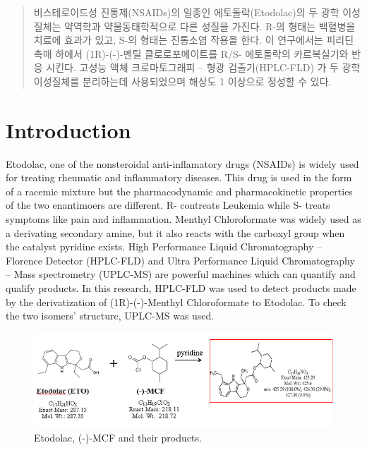 \documentclass[12pt]{article} %
\begin{document}
\renewcommand\abstractname{초\hskip6mm 록}
\begin{abstract}
  비스테로이드성 진통제(NSAIDs)의 일종인 에토돌락(Etodolac)의 두 광학 이성질체는 약역학과 약물동태학적으로 다른 성질을 가진다. R-의 형태는 백혈병을 치료에 효과가 있고, S-의 형태는 진통소염 작용을 한다. 이 연구에서는 피리딘 촉매 하에서 (1R)-(-)-멘틸 클로로포메이트를 R/S- 에토돌락의 카르복실기와 반응 시킨다. 고성능 액체 크로마토그래피 – 형광 검출기(HPLC-FLD) 가 두 광학 이성질체를 분리하는데 사용되었으며 해상도 1 이상으로 정성할 수 있다.

\end{abstract}

\newpage

\tableofcontents

\newpage

\listoffigures

\newpage

\listoftables

\newpage



\setcounter{page}{1}

\section{Introduction}

Etodolac, one of the nonsteroidal anti-inflamatory drugs (NSAIDs) is widely used for treating rheumatic and inflammatory diseases. This drug is used in the form of a racemic mixture but the pharmacodynamic and pharmacokinetic properties of the two enantimoers are different. R- contreats Leukemia\cite{cite1} while S- treats symptoms like pain and inflammation. Menthyl Chloroformate was widely used as a derivating secondary amine, but it also reacts with the carboxyl group when the catalyst pyridine exists.
High Performance Liquid Chromatography – Florence Detector (HPLC-FLD) and Ultra Performance Liquid Chromatography – Mass spectrometry (UPLC-MS) are powerful machines which can quantify and qualify products. 
In this research, HPLC-FLD was used to detect products made by the derivatization of (1R)-(-)-Menthyl Chloroformate to Etodolac. To check the two isomers' structure, UPLC-MS was used.


\begin{figure}[h]
  \includegraphics[width=\linewidth]{fig1.png}
  \caption{Etodolac, (-)-MCF and their products.}
  \label{fig:fig1}
\end{figure}
\end{document}
